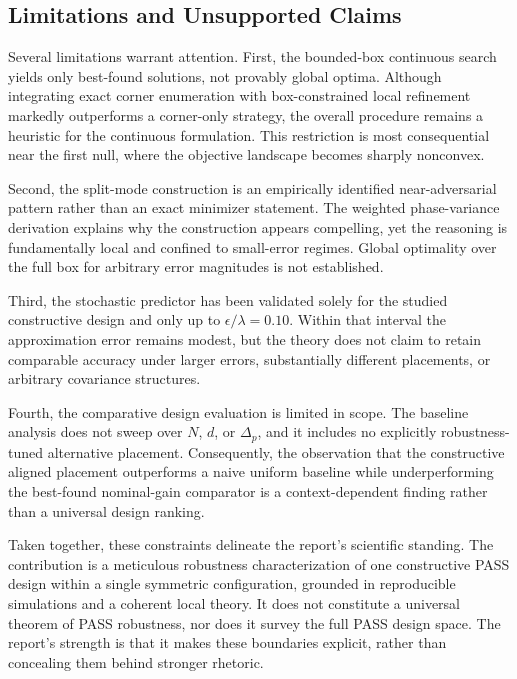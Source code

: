 \subsection{Limitations and Unsupported Claims}

Several limitations warrant attention. First, the bounded-box continuous search yields only best-found solutions, not provably global optima. Although integrating exact corner enumeration with box-constrained local refinement markedly outperforms a corner-only strategy, the overall procedure remains a heuristic for the continuous formulation. This restriction is most consequential near the first null, where the objective landscape becomes sharply nonconvex.

Second, the split-mode construction is an empirically identified near-adversarial pattern rather than an exact minimizer statement. The weighted phase-variance derivation explains why the construction appears compelling, yet the reasoning is fundamentally local and confined to small-error regimes. Global optimality over the full box for arbitrary error magnitudes is not established.

Third, the stochastic predictor has been validated solely for the studied constructive design and only up to $\epsilon/\lambda = 0.10$. Within that interval the approximation error remains modest, but the theory does not claim to retain comparable accuracy under larger errors, substantially different placements, or arbitrary covariance structures.

Fourth, the comparative design evaluation is limited in scope. The baseline analysis does not sweep over $N$, $d$, or $\Delta_p$, and it includes no explicitly robustness-tuned alternative placement. Consequently, the observation that the constructive aligned placement outperforms a naive uniform baseline while underperforming the best-found nominal-gain comparator is a context-dependent finding rather than a universal design ranking.

Taken together, these constraints delineate the report’s scientific standing. The contribution is a meticulous robustness characterization of one constructive PASS design within a single symmetric configuration, grounded in reproducible simulations and a coherent local theory. It does not constitute a universal theorem of PASS robustness, nor does it survey the full PASS design space. The report’s strength is that it makes these boundaries explicit, rather than concealing them behind stronger rhetoric.

